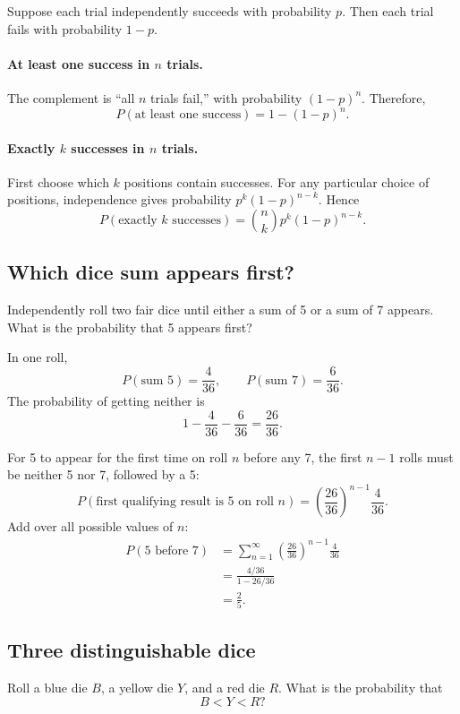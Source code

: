 \documentclass[11pt]{article}
\begin{document}
Suppose each trial independently succeeds with probability $p$.
Then each trial fails with probability $1-p$.

\paragraph{At least one success in $n$ trials.}
The complement is ``all $n$ trials fail,'' with probability
$(1-p)^n$. Therefore,
\[
\boxed{
P(\text{at least one success})=1-(1-p)^n.
}
\]

\paragraph{Exactly $k$ successes in $n$ trials.}
First choose which $k$ positions contain successes. For any
particular choice of positions, independence gives probability
$p^k(1-p)^{n-k}$. Hence
\[
\boxed{
P(\text{exactly $k$ successes})
=\binom{n}{k}p^k(1-p)^{n-k}.
}
\]

\subsection{Which dice sum appears first?}

Independently roll two fair dice until either a sum of 5 or a
sum of 7 appears. What is the probability that 5 appears first?

In one roll,
\[
P(\text{sum 5})=\frac4{36},\qquad
P(\text{sum 7})=\frac6{36}.
\]
The probability of getting neither is
\[
1-\frac4{36}-\frac6{36}=\frac{26}{36}.
\]

For 5 to appear for the first time on roll $n$ before any 7,
the first $n-1$ rolls must be neither 5 nor 7, followed by a 5:
\[
P(\text{first qualifying result is 5 on roll $n$})
=
\left(\frac{26}{36}\right)^{n-1}\frac4{36}.
\]
Add over all possible values of $n$:
\[
\begin{aligned}
P(\text{5 before 7})
&=\sum_{n=1}^{\infty}
\left(\frac{26}{36}\right)^{n-1}\frac4{36}\\
&=\frac{4/36}{1-26/36}\\
&=\boxed{\frac25}.
\end{aligned}
\]

\subsection{Three distinguishable dice}

Roll a blue die $B$, a yellow die $Y$, and a red die $R$.
What is the probability that
\[
B<Y<R?
\]
\end{document}
